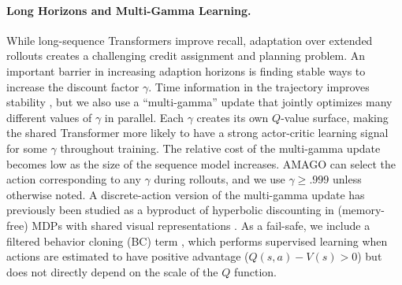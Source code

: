 \documentclass{article}
\begin{document}
\paragraph{Long Horizons and Multi-Gamma Learning.} While long-sequence Transformers improve recall, adaptation over extended rollouts creates a challenging credit assignment and planning problem. An important barrier in increasing adaption horizons is finding stable ways to increase the discount factor $\gamma$. Time information in the trajectory improves stability \cite{pardo2018time}, but we also use a ``multi-gamma'' update that jointly optimizes many different values of $\gamma$ in parallel. Each $\gamma$ creates its own $Q$-value surface, making the shared Transformer more likely to have a strong actor-critic learning signal for some $\gamma$ throughout training. The relative cost of the multi-gamma update becomes low as the size of the sequence model increases. AMAGO can select the action corresponding to any $\gamma$ during rollouts, and we use $\gamma \geq .999$ unless otherwise noted. A discrete-action version of the multi-gamma update has previously been studied as a byproduct of hyperbolic discounting in (memory-free) MDPs with shared visual representations \cite{fedus2019hyperbolic}. As a fail-safe, we include a filtered behavior cloning (BC) term \cite{wang2020critic, nair2018overcoming}, which performs supervised learning when actions are estimated to have positive advantage ($Q(s, a) - V(s) > 0$) but does not directly depend on the scale of the $Q$ function.
\end{document}
